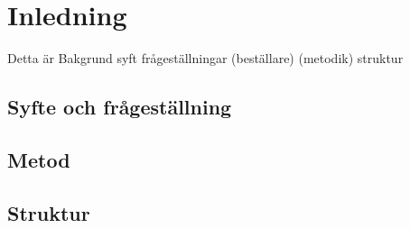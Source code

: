 \section{Inledning}
Detta är Bakgrund syft frågeställningar (beställare) (metodik) struktur
\subsection{Syfte och frågeställning}
\subsection{Metod}
\subsection{Struktur}